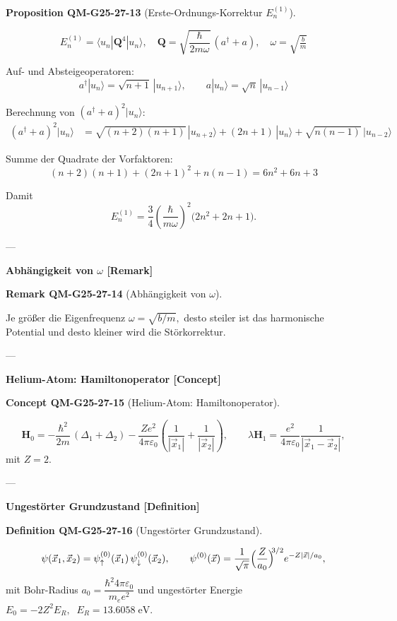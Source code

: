 \documentclass[10pt, letterpaper]{article}
\newcommand{\CustomHeading}[3]{%
  \par\medskip\noindent%
  \textbf{#1 #2} \textnormal{(#3)}.\enskip%
}
\newenvironment{DEF}[2]{\begin{unitbox}\CustomHeading{Definition}{#1}{#2}}{\end{unitbox}}
\newenvironment{PROP}[2]{\begin{unitbox}\CustomHeading{Proposition}{#1}{#2}}{\end{unitbox}}
\newenvironment{REM}[2]{\begin{unitbox}\CustomHeading{Remark}{#1}{#2}}{\end{unitbox}}
\newenvironment{CONC}[2]{\begin{unitbox}\CustomHeading{Concept}{#1}{#2}}{\end{unitbox}}
\begin{document}
\begin{PROP}{QM-G25-27-13}{Erste-Ordnungs-Korrektur $E_n^{(1)}$}
\[
E_n^{(1)} = \langle u_n | \mathbf{Q}^4 | u_n \rangle,
\quad
\mathbf{Q} = \sqrt{\frac{\hbar}{2m\omega}}\,(a^{\dagger}+a),
\quad
\omega = \sqrt{\tfrac{b}{m}}
\]

Auf- und Absteigeoperatoren:
\[
a^{\dagger}|u_n\rangle = \sqrt{n+1}\,|u_{n+1}\rangle, \qquad
a|u_n\rangle          = \sqrt{n}\,  |u_{n-1}\rangle
\]

Berechnung von $(a^{\dagger}+a)^2|u_n\rangle$:
\[
\begin{aligned}
(a^{\dagger}+a)^2|u_n\rangle &=
\sqrt{(n+2)(n+1)}\,|u_{n+2}\rangle
+(2n+1)\,|u_{n}\rangle
+\sqrt{n(n-1)}\,|u_{n-2}\rangle
\end{aligned}
\]

Summe der Quadrate der Vorfaktoren:
\[
(n+2)(n+1) + (2n+1)^2 + n(n-1) = 6n^{2}+6n+3
\]

Damit
\[
E_n^{(1)} =
\frac{3}{4}\left(\frac{\hbar}{m\omega}\right)^{2}\bigl(2n^{2}+2n+1\bigr).
\]
\end{PROP}

---

\textbf{Abhängigkeit von $\omega$ [Remark]}

\begin{REM}{QM-G25-27-14}{Abhängigkeit von $\omega$}
Je größer die Eigenfrequenz 
\(
\omega=\sqrt{b/m},
\)
desto steiler ist das harmonische Potential und desto kleiner wird die Störkorrektur.
\end{REM}

---

\textbf{Helium-Atom: Hamiltonoperator [Concept]}

\begin{CONC}{QM-G25-27-15}{Helium-Atom: Hamiltonoperator}
\[
\mathbf{H}_0 =
-\frac{\hbar^{2}}{2m}\,(\Delta_1+\Delta_2)
-\frac{Ze^{2}}{4\pi\varepsilon_0}\!\left(\frac{1}{|\vec x_1|} + \frac{1}{|\vec x_2|}\right),
\qquad
\lambda\mathbf{H}_1 = \frac{e^{2}}{4\pi\varepsilon_0}\frac{1}{|\vec x_1-\vec x_2|},
\]
mit $Z=2$.
\end{CONC}

---

\textbf{Ungestörter Grundzustand [Definition]}

\begin{DEF}{QM-G25-27-16}{Ungestörter Grundzustand}
\[
\psi(\vec x_1,\vec x_2) =
\psi_{\uparrow}^{(0)}(\vec x_1)\,
\psi_{\downarrow}^{(0)}(\vec x_2), \qquad
\psi^{(0)}(\vec x)=
\frac{1}{\sqrt{\pi}}
\Bigl(\frac{Z}{a_0}\Bigr)^{\!\!3/2}
e^{-Z|\vec x|/a_0},
\]
mit Bohr-Radius
\(
a_0=\dfrac{\hbar^{2}4\pi\varepsilon_0}{m_e e^{2}}
\)
und ungestörter Energie
\(
E_0=-2Z^{2}E_R,\;\;
E_R=13.6058\;\text{eV}.
\)
\end{DEF}
\end{document}
